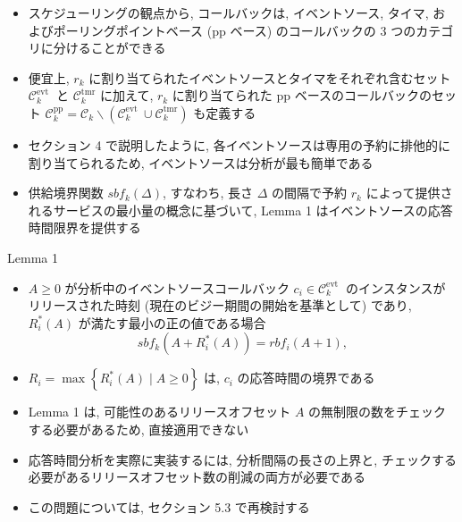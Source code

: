 \begin{frame}{}
    \begin{itemize}
        \item スケジューリングの観点から, コールバックは, イベントソース, タイマ, およびポーリングポイントベース (pp ベース) のコールバックの 3 つのカテゴリに分けることができる
        \item 便宜上, $r_{k}$ に割り当てられたイベントソースとタイマをそれぞれ含むセット $\mathcal{C}_{k}^{\text {evt }}$ と $\mathcal{C}_{k}^{\mathrm{tmr}}$ に加えて, $r_{k}$ に割り当てられた pp ベースのコールバックのセット $\mathcal{C}_{k}^{\mathrm{pp}}=\mathcal{C}_{k} \backslash\left(\mathcal{C}_{k}^{\text {evt }} \cup \mathcal{C}_{k}^{\mathrm{tmr}}\right)$ も定義する
        \item セクション 4 で説明したように, 各イベントソースは専用の予約に排他的に割り当てられるため, イベントソースは分析が最も簡単である
        \item 供給境界関数 $s b f_{k}(\Delta)$, すなわち, 長さ $\Delta$ の間隔で予約 $r_{k}$ によって提供されるサービスの最小量の概念に基づいて, Lemma 1 はイベントソースの応答時間限界を提供する
    \end{itemize}
\end{frame}

\begin{frame}[label=lemma1]{Lemma 1}
    \begin{lemma}[]
        \begin{itemize}
            \item $A \geq 0$ が分析中のイベントソースコールバック $c_{i} \in \mathcal{C}_{k}^{\text {evt }}$ のインスタンスがリリースされた時刻 (現在のビジー期間の開始を基準として) であり, $R_{i}^{*}(A)$ が満たす最小の正の値である場合
                  \begin{equation*}
                      s b f_{k}\left(A+R_{i}^{*}(A)\right)=r b f_{i}(A+1),
                  \end{equation*}

            \item $R_{i}=\max \left\{R_{i}^{*}(A) \mid A \geq 0\right\}$ は, $c_{i}$ の応答時間の境界である
        \end{itemize}
    \end{lemma}
\end{frame}

\begin{frame}{}
    \begin{itemize}
        \item Lemma 1 は, 可能性のあるリリースオフセット $A$ の無制限の数をチェックする必要があるため, 直接適用できない
        \item 応答時間分析を実際に実装するには, 分析間隔の長さの上界と, チェックする必要があるリリースオフセット数の削減の両方が必要である
        \item この問題については, セクション 5.3 で再検討する
    \end{itemize}
\end{frame}

